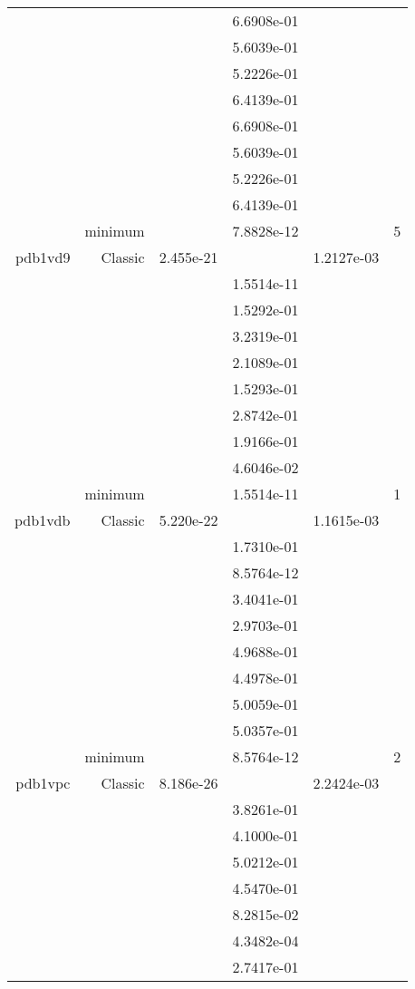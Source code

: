 \begin{xltabular}{\textwidth}{r|rS[table-format=1.3e+2]S[table-format=1.4e+2]S[table-format=1.4e+2]S[table-format=-1.5]}
&  &  & 6.6908e-01 & & \\
&  &  & 5.6039e-01 & & \\
&  &  & 5.2226e-01 & & \\
&  &  & 6.4139e-01 & & \\
&  &  & 6.6908e-01 & & \\
&  &  & 5.6039e-01 & & \\
&  &  & 5.2226e-01 & & \\
&  &  & 6.4139e-01 & & \\
& minimum &  & 7.8828e-12 & & 5 \\  \addlinespace
pdb1vd9 & Classic & 2.455e-21 &  & 1.2127e-03 & \\
&  &  & 1.5514e-11 & & \\
&  &  & 1.5292e-01 & & \\
&  &  & 3.2319e-01 & & \\
&  &  & 2.1089e-01 & & \\
&  &  & 1.5293e-01 & & \\
&  &  & 2.8742e-01 & & \\
&  &  & 1.9166e-01 & & \\
&  &  & 4.6046e-02 & & \\
& minimum &  & 1.5514e-11 & & 1 \\  \addlinespace
pdb1vdb & Classic & 5.220e-22 &  & 1.1615e-03 & \\
&  &  & 1.7310e-01 & & \\
&  &  & 8.5764e-12 & & \\
&  &  & 3.4041e-01 & & \\
&  &  & 2.9703e-01 & & \\
&  &  & 4.9688e-01 & & \\
&  &  & 4.4978e-01 & & \\
&  &  & 5.0059e-01 & & \\
&  &  & 5.0357e-01 & & \\
& minimum &  & 8.5764e-12 & & 2 \\  \addlinespace
pdb1vpc & Classic & 8.186e-26 &  & 2.2424e-03 & \\
&  &  & 3.8261e-01 & & \\
&  &  & 4.1000e-01 & & \\
&  &  & 5.0212e-01 & & \\
&  &  & 4.5470e-01 & & \\
&  &  & 8.2815e-02 & & \\
&  &  & 4.3482e-04 & & \\
&  &  & 2.7417e-01 & & \\

\end{xltabular}
